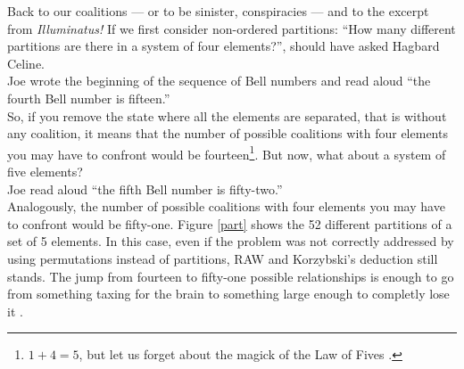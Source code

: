 Back to our coalitions --- or to be sinister, conspiracies --- and to the excerpt from \textit{Illuminatus!} If we first consider non-ordered partitions: ``How many different partitions are there in a system of four elements?'', should have asked Hagbard Celine.\\
Joe wrote the beginning of the sequence of Bell numbers and read aloud ``the fourth Bell number is fifteen.''\\
So, if you remove the state where all the elements are separated, that is without any coalition, it means that the number of possible coalitions with four elements you may have to confront would be fourteen\footnote{$1+4=5$, but let us forget about the magick of the Law of Fives \cite{Malaclypse1963}.}. But now, what about a system of five elements?\\
Joe read aloud ``the fifth Bell number is fifty-two.''\\
Analogously, the number of possible coalitions with four elements you may have to confront would be fifty-one. Figure \ref{part} shows the 52 different partitions of a set of 5 elements.
In this case, even if the problem was not correctly addressed by using permutations instead of partitions, RAW and Korzybski's deduction still stands. 
The jump from fourteen to fifty-one possible relationships is enough to go from something taxing for the brain to something large enough to completly lose it \cite{Kelly1955, Korzybski1933}. \\

